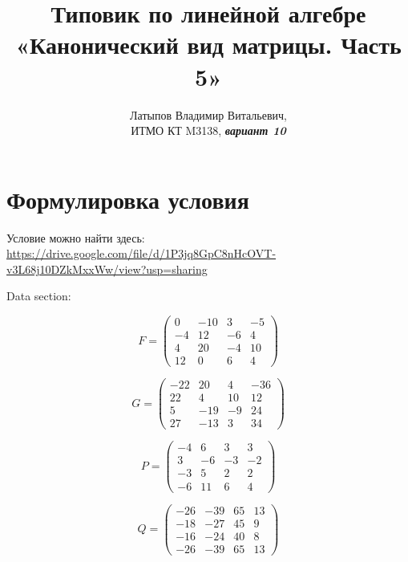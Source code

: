 \documentclass[12pt, a4paper]{article}
\author{Латыпов Владимир Витальевич, \\ ИТМО КТ M3138, \Huge{\textit{\textbf{вариант 10}}}}
\title{Типовик по линейной алгебре «Канонический вид матрицы. Часть 5»}
\begin{document}
    \tit

    \section{Формулировка условия}

    \begin{statement}
        Условие можно найти здесь: \url{https://drive.google.com/file/d/1P3jq8GpC8nHcOVT-v3L68j10DZkMxxWw/view?usp=sharing}

        Data section:

        \begin{equation}
            F = \left(\begin{matrix}
                0 & -10 & 3 & -5 \\
                -4 & 12 & -6 & 4 \\
                4 & 20 & -4 & 10 \\
                12 & 0 & 6 & 4
            \end{matrix}\right)
        \end{equation}

        \begin{equation}
            G = \left(\begin{matrix}
                -22 & 20 & 4 & -36 \\
                22 & 4 & 10 & 12 \\
                5 & -19 & -9 & 24 \\
                27 & -13 & 3 & 34
            \end{matrix}\right)
        \end{equation}

        \begin{equation}
            P = \left(\begin{matrix}
                -4 & 6 & 3 & 3 \\
                3 & -6 & -3 & -2 \\
                -3 & 5 & 2 & 2 \\
                -6 & 11 & 6 & 4
            \end{matrix}\right)
        \end{equation}

        \begin{equation}
            Q = \left(\begin{matrix}
                -26 & -39 & 65 & 13 \\
                -18 & -27 & 45 & 9 \\
                -16 & -24 & 40 & 8 \\
                -26 & -39 & 65 & 13
            \end{matrix}\right)
        \end{equation}


\end{statement}
\end{document}
